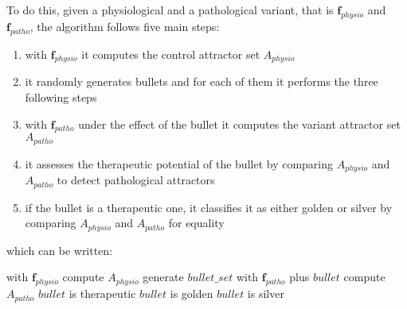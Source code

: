 \documentclass[oneside,a4paper,onecolumn,notitlepage]{article}
\begin{document}
To do this, given a physiological and a pathological variant, that is $\boldsymbol{f}_{physio}$ and $\boldsymbol{f}_{patho}$, the algorithm follows five main steps:
\begin{enumerate}
\item with $\boldsymbol{f}_{physio}$ it computes the control attractor set $A_{physio}$
\item it randomly generates bullets and for each of them it performs the three following steps
\item with $\boldsymbol{f}_{patho}$ under the effect of the bullet it computes the variant attractor set $A_{patho}$
\item it assesses the therapeutic potential of the bullet by comparing $A_{physio}$ and $A_{patho}$ to detect pathological attractors
\item if the bullet is a therapeutic one, it classifies it as either golden or silver by comparing $A_{physio}$ and $A_{patho}$ for equality
\end{enumerate}
which can be written:
\begin{algorithmic}[1]
\STATE with $\boldsymbol{f}_{physio}$ compute $A_{physio}$
\STATE generate $bullet\_set$
    \STATE with $\boldsymbol{f}_{patho}$ plus $bullet$ compute $A_{patho}$
        \STATE $bullet$ is therapeutic
            \STATE $bullet$ is golden
        \ELSE
            \STATE $bullet$ is silver
        \ENDIF
    \ENDIF
\ENDFOR
\end{algorithmic}
\end{document}
